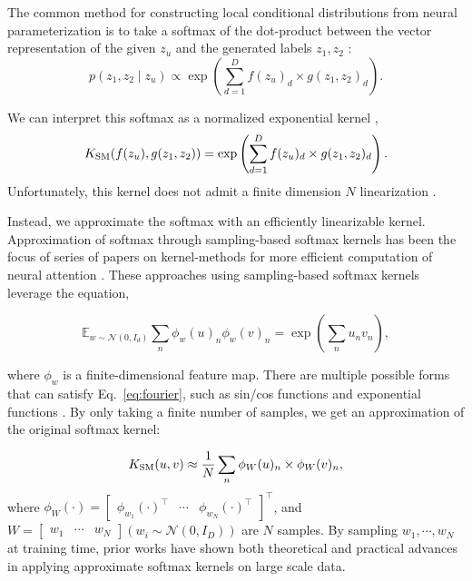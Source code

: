 \documentclass{article}
\begin{document}
The common method for constructing local conditional distributions from neural parameterization is to take a softmax of the dot-product between the vector representation of the given $z_u$ and the generated labels $z_1,z_2$ \cite{he2017efficient}:
\[ p(z_1, z_2 \mid z_{u}) \propto \exp \left(\sum_{d=1}^D f(z_u)_d \times g(z_1, z_2)_d \right).\] 

We can interpret this softmax as a normalized exponential kernel \citep{tsai2019kernelattn},
\[  K_{\mathrm{SM}}(f(z_u), g(z_1, z_2)) = \exp \left(\sum_{d=1}^D f(z_u)_d \times g(z_1, z_2)_d \right).  \] 
Unfortunately, this kernel does not admit a finite dimension $N$ linearization \citep{steinwart2006explicit}. 

Instead, we approximate the softmax with an efficiently linearizable kernel. Approximation of softmax through sampling-based softmax kernels has been the focus of series of papers on
kernel-methods for more efficient computation of neural attention
\citep{choromanski2020performer,katharopoulos2020lineartransformer,peng2021rfa,shen2018linearattn}. These approaches using sampling-based softmax kernels leverage the equation,

\begin{equation}
\label{eq:fourier}
    \mathbb{E}_{w\sim \mathcal{N}(0, I_d)} \sum_n \phi_{w} (u)_n \phi_w(v)_n  = \exp\left(\sum_n u_n  v_n\right),
\end{equation}

where $\phi_{w}$ is a finite-dimensional feature map. There are multiple possible forms that can satisfy Eq.~\ref{eq:fourier}, such as sin/cos functions \cite{rahimi2007rff,rawat2019sampledsoftmax} and exponential functions \citep{choromanski2020performer}. By only taking a finite number of samples, we get an approximation of the original softmax kernel:

\begin{equation*}
    K_{\mathrm{SM}}(u, v) \approx \frac{1}{N} \sum_n \phi_W(u)_n \times \phi_W(v)_n,
\end{equation*}
where $\phi_W(\cdot) = \begin{bmatrix}\phi_{w_1} (\cdot)^\top &\cdots &\phi_{w_N}(\cdot)^\top \end{bmatrix}^\top$, and $W=\begin{bmatrix}w_1 & \cdots & w_N \end{bmatrix} (w_i \sim \mathcal{N}(0, I_D))$ are $N$ samples.  By sampling $w_1, \cdots, w_N$ at training time, prior works have shown both theoretical and practical advances in
applying approximate softmax kernels on large scale data. 
\end{document}
